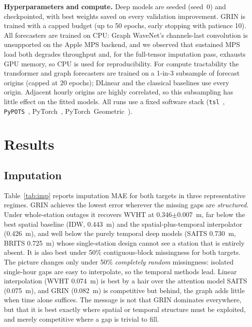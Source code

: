 \documentclass[11pt]{article}
\begin{document}
\noindent\textbf{Hyperparameters and compute.} Deep models are seeded
(seed~0) and checkpointed, with best weights saved on every validation improvement.
GRIN is trained with a capped budget (up to 50 epochs, early stopping with patience
10). All forecasters are trained on CPU: Graph WaveNet's channels-last convolution
is unsupported on the Apple MPS backend, and we observed that sustained MPS load
both degrades throughput and, for the full-tensor imputation pass, exhausts GPU
memory, so CPU is used for reproducibility. For compute tractability the transformer
and graph forecasters are trained on a 1-in-3 subsample of forecast origins (capped
at 20 epochs); DLinear and the classical baselines use every origin. Adjacent hourly
origins are highly correlated, so this subsampling has little effect on the fitted
models. All runs use a fixed software stack (\texttt{tsl}~\citep{tsl},
\texttt{PyPOTS}~\citep{pypots}, PyTorch~\citep{pytorch}, PyTorch~Geometric~\citep{pyg}).

\section{Results}
\label{sec:results}

\subsection{Imputation}
Table~\ref{tab:imp} reports imputation MAE for both targets in three
representative regimes. GRIN achieves the lowest error wherever the missing gaps
are \emph{structured}. Under whole-station outages it recovers WVHT at
0.346$\pm$0.007~m, far below the best spatial baseline (IDW, 0.443~m) and
the spatial-plus-temporal interpolator (0.426~m), and well below the
purely temporal deep models (SAITS 0.730~m, BRITS 0.725~m)
whose single-station design cannot see a station that is entirely absent. It is
also best under 50\% contiguous-block missingness for both targets. The picture
changes only under 50\% \emph{completely random} missingness: isolated single-hour
gaps are easy to interpolate, so the temporal methods lead. Linear interpolation
(WVHT 0.074~m) is best by a hair over the attention model SAITS
(0.075~m), and GRIN (0.082~m) is competitive but behind, the
graph adds little when time alone suffices. The message is not that GRIN dominates
everywhere, but that it is best exactly where spatial or temporal structure must be
exploited, and merely competitive where a gap is trivial to fill.
\end{document}
